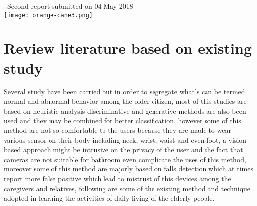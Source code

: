 \documentclass[a4paper, parskip=full]{scrartcl}
\begin{document}
\begin{titlepage}
	
	
	{\large \ Second report submitted on 04-May-2018}\\[0.2cm] %
	
	
	\texttt{[image: orange-cane3.png]}\\[0.2cm] %
	
	
	\vfill %
	
\end{titlepage}







 \section*{Review literature based on existing study}
 
Several study have been carried out in order to segregate what’s can be termed normal and abnormal behavior among the older citizen, most of this studies are based on heuristic analysis discriminative and generative methods are also been used and they may be combined for better classification. however some of this method are not so comfortable to the users because they are made to wear various sensor on their body including neck, wrist, waist and even foot, a vision based approach might be intrusive on the privacy of the user and the fact that cameras are not suitable for bathroom even complicate the uses of this method, moreover some of this method are majorly based on falls detection which at times report more false positive which lead to mistrust of this devices among the caregivers and relatives, following are some of the existing method and technique adopted in learning the activities of daily living of the elderly people.
\end{document}
